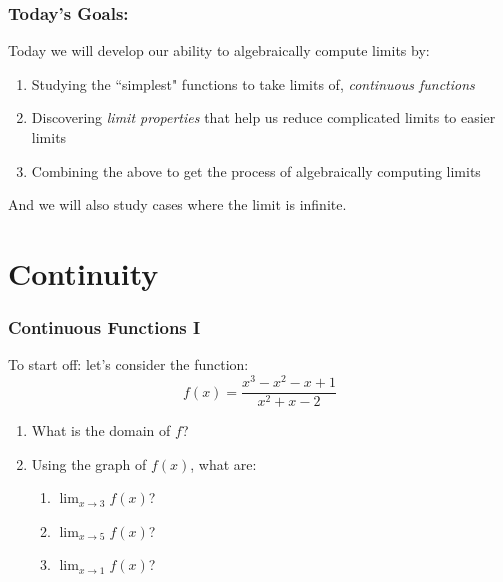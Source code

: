 \documentclass{ltx-talk}
\begin{document}
\begin{frame}
  \frametitle{Today's Goals:}

  Today we will develop our ability to algebraically compute limits by: \pause
  \begin{enumerate}
    \item Studying the ``simplest" functions to take limits of, \textit{continuous functions}
    \item Discovering \textit{limit properties} that help us reduce complicated limits to easier limits \pause
    \item Combining the above to get the process of algebraically computing limits
  \end{enumerate}

  And we will also study cases where the limit is infinite.
\end{frame}

\section{Continuity}

\begin{frame}
  \frametitle{Continuous Functions I}

  To start off: let's consider the function: 
  \begin{equation}
    f(x) = \dfrac{x^3 - x^2 - x + 1}{x^2 + x - 2}
  \end{equation} \pause

  \begin{enumerate}
    \item What is the domain of $f$? \pause
    \item Using the graph of $f(x)$, what are:
      \begin{enumerate}
        \item $\lim_{x \rightarrow 3}f(x)$?
        \item $\lim_{x \rightarrow 5}f(x)$?
        \item $\lim_{x \rightarrow 1} f(x)$? \pause
      \end{enumerate}

  \end{enumerate}
\end{frame}
\end{document}
